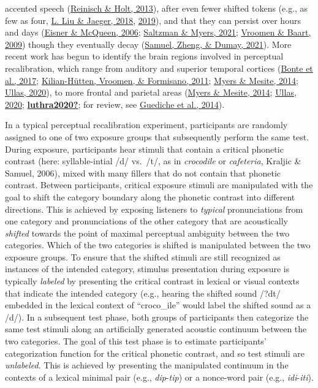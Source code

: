 \documentclass[
  11pt,
  english,
  man,floatsintext]{apa6}
\begin{document}
accented speech (\protect\hyperlink{ref-reinisch-holt2013}{Reinisch \& Holt, 2013}), after even fewer shifted tokens (e.g., as few as four, \protect\hyperlink{ref-liu-jaeger2018}{L. Liu \& Jaeger, 2018}, \protect\hyperlink{ref-liu-jaeger2019}{2019}), and that they can persist over hours and days (\protect\hyperlink{ref-eisner-mcqueen2006}{Eisner \& McQueen, 2006}; \protect\hyperlink{ref-saltzman-myers2021}{Saltzman \& Myers, 2021}; \protect\hyperlink{ref-vroomen-baart2009}{Vroomen \& Baart, 2009}) though they eventually decay (\protect\hyperlink{ref-samuel2021}{Samuel, Zheng, \& Dumay, 2021}). More recent work has begun to identify the brain regions involved in perceptual recalibration, which range from auditory and superior temporal cortices (\protect\hyperlink{ref-bonte2017}{Bonte et al., 2017}; \protect\hyperlink{ref-kilianhutten2011}{Kilian-Hütten, Vroomen, \& Formisano, 2011}; \protect\hyperlink{ref-myers-mesite2014}{Myers \& Mesite, 2014}; \protect\hyperlink{ref-ullas2020}{Ullas, 2020}), to more frontal and parietal areas (\protect\hyperlink{ref-myers-mesite2014}{Myers \& Mesite, 2014}; \protect\hyperlink{ref-ullas2020}{Ullas, 2020}; \protect\hyperlink{ref-luthra2020}{\textbf{luthra2020?}}; for review, see \protect\hyperlink{ref-guediche2014}{Guediche et al., 2014}).

In a typical perceptual recalibration experiment, participants are randomly assigned to one of two exposure groups that subsequently perform the same test. During exposure, participants hear stimuli that contain a critical phonetic contrast (here: syllable-intial /d/ vs.~/t/, as in \emph{croco\emph{d}ile} or \emph{cafe\emph{t}eria}, Kraljic \& Samuel, 2006), mixed with many fillers that do not contain that phonetic contrast. Between participants, critical exposure stimuli are manipulated with the goal to shift the category boundary along the phonetic contrast into different directions. This is achieved by exposing listeners to \emph{typical} pronunciations from one category and pronunciations of the other category that are acoustically \emph{shifted} towards the point of maximal perceptual ambiguity between the two categories. Which of the two categories is shifted is manipulated between the two exposure groups. To ensure that the shifted stimuli are still recognized as instances of the intended category, stimulus presentation during exposure is typically \emph{labeled} by presenting the critical contrast in lexical or visual contexts that indicate the intended category (e.g., hearing the shifted sound /?dt/ embedded in the lexical context of ``croco\_ile'' would label the shifted sound as a /d/). In a subsequent test phase, both groups of participants then categorize the same test stimuli along an artificially generated acoustic continuum between the two categories. The goal of this test phase is to estimate participants' categorization function for the critical phonetic contrast, and so test stimuli are \emph{unlabeled}. This is achieved by presenting the manipulated continuum in the contexts of a lexical minimal pair (e.g., \emph{dip}-\emph{tip}) or a nonce-word pair (e.g., \emph{idi}-\emph{iti}).
\end{document}
